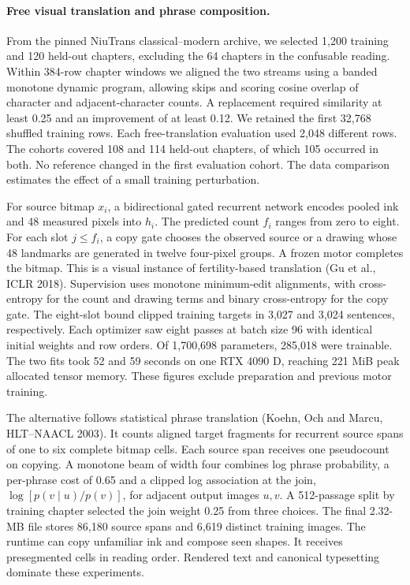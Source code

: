 \paragraph{Free visual translation and phrase composition.}
From the pinned NiuTrans classical--modern archive, we selected 1,200 training and 120 held-out chapters, excluding the 64 chapters in the confusable reading. Within 384-row chapter windows we aligned the two streams using a banded monotone dynamic program, allowing skips and scoring cosine overlap of character and adjacent-character counts. A replacement required similarity at least 0.25 and an improvement of at least 0.12. We retained the first 32,768 shuffled training rows. Each free-translation evaluation used 2,048 different rows. The cohorts covered 108 and 114 held-out chapters, of which 105 occurred in both. No reference changed in the first evaluation cohort. The data comparison estimates the effect of a small training perturbation.

For source bitmap $x_i$, a bidirectional gated recurrent network encodes pooled ink and 48 measured pixels into $h_i$. The predicted count $f_i$ ranges from zero to eight. For each slot $j\le f_i$, a copy gate chooses the observed source or a drawing whose 48 landmarks are generated in twelve four-pixel groups. A frozen motor completes the bitmap. This is a visual instance of fertility-based translation \textup{(Gu et al., ICLR 2018)}. Supervision uses monotone minimum-edit alignments, with cross-entropy for the count and drawing terms and binary cross-entropy for the copy gate. The eight-slot bound clipped training targets in 3,027 and 3,024 sentences, respectively. Each optimizer saw eight passes at batch size 96 with identical initial weights and row orders. Of 1,700,698 parameters, 285,018 were trainable. The two fits took 52 and 59 seconds on one RTX 4090 D, reaching 221 MiB peak allocated tensor memory. These figures exclude preparation and previous motor training.

The alternative follows statistical phrase translation \textup{(Koehn, Och and Marcu, HLT--NAACL 2003)}. It counts aligned target fragments for recurrent source spans of one to six complete bitmap cells. Each source span receives one pseudocount on copying. A monotone beam of width four combines log phrase probability, a per-phrase cost of 0.65 and a clipped log association at the join, $\log[p(v\mid u)/p(v)]$, for adjacent output images $u,v$. A 512-passage split by training chapter selected the join weight 0.25 from three choices. The final 2.32-MB file stores 86,180 source spans and 6,619 distinct training images. The runtime can copy unfamiliar ink and compose seen shapes. It receives presegmented cells in reading order. Rendered text and canonical typesetting dominate these experiments.


